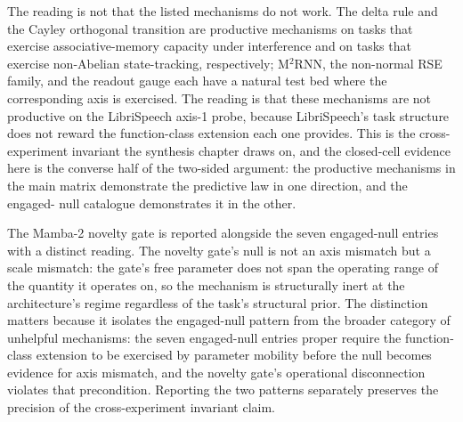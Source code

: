 The reading is not that the listed mechanisms do not work. The
delta rule and the Cayley orthogonal transition are productive
mechanisms on tasks that exercise associative-memory capacity under
interference and on tasks that exercise non-Abelian state-tracking,
respectively; M$^{2}$RNN, the non-normal RSE family, and the readout
gauge each have a natural test bed where the corresponding axis is
exercised. The reading is that these mechanisms are not productive
on the LibriSpeech axis-1 probe, because LibriSpeech's task structure
does not reward the function-class extension each one provides. This
is the cross-experiment invariant the synthesis chapter draws on,
and the closed-cell evidence here is the converse half of the
two-sided argument: the productive mechanisms in the main matrix
demonstrate the predictive law in one direction, and the engaged-
null catalogue demonstrates it in the other.

The Mamba-2 novelty gate is reported alongside the seven
engaged-null entries with a distinct reading. The novelty gate's
null is not an axis mismatch but a scale mismatch: the gate's free
parameter does not span the operating range of the quantity it
operates on, so the mechanism is structurally inert at the
architecture's regime regardless of the task's structural prior.
The distinction matters because it isolates the engaged-null
pattern from the broader category of unhelpful mechanisms: the
seven engaged-null entries proper require the function-class
extension to be exercised by parameter mobility before the null
becomes evidence for axis mismatch, and the novelty gate's
operational disconnection violates that precondition. Reporting the
two patterns separately preserves the precision of the
cross-experiment invariant claim.

